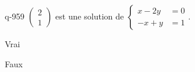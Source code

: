 \begin{truefalse}{q-959}
$\begin{pmatrix}2\\1\end{pmatrix}$ est une solution de $\begin{cases}x-2y &= 0 \\ -x+y &= 1\end{cases}$.
\item Vrai
\item* Faux
\end{truefalse}

